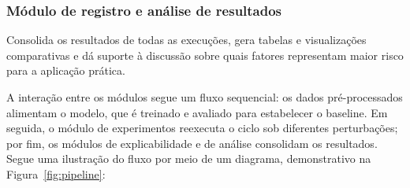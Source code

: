 \documentclass[
    12pt,
    openright,
    oneside,
    a4paper,
    english,
    brazil
]{abntex2}
\begin{document}
\subsubsection{Módulo de registro e análise de resultados}

Consolida os resultados de todas as execuções, gera tabelas e visualizações comparativas e dá suporte à discussão sobre quais fatores representam maior risco para a aplicação prática.

A interação entre os módulos segue um fluxo sequencial: os dados pré-processados alimentam o modelo, que é treinado e avaliado para estabelecer o baseline. Em seguida, o módulo de experimentos reexecuta o ciclo sob diferentes perturbações; por fim, os módulos de explicabilidade e de análise consolidam os resultados. Segue uma ilustração do fluxo por meio de um diagrama, demonstrativo na Figura~\ref{fig:pipeline}:
\end{document}
